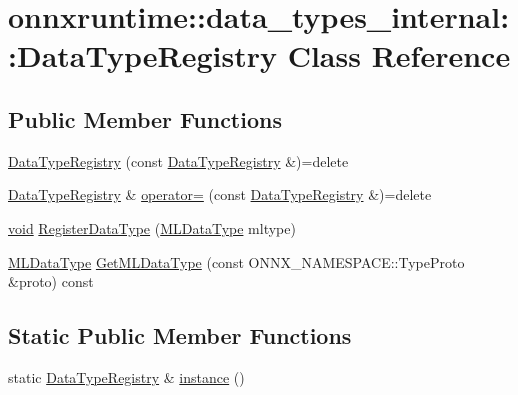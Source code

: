 \hypertarget{classonnxruntime_1_1data__types__internal_1_1DataTypeRegistry}{}\section{onnxruntime\+:\+:data\+\_\+types\+\_\+internal\+:\+:Data\+Type\+Registry Class Reference}
\label{classonnxruntime_1_1data__types__internal_1_1DataTypeRegistry}
\subsection*{Public Member Functions}
\begin{DoxyCompactItemize}
\item 
\mbox{\hyperlink{classonnxruntime_1_1data__types__internal_1_1DataTypeRegistry_a419c4ff0fd3f15aa7598a2a21339631a}{Data\+Type\+Registry}} (const \mbox{\hyperlink{classonnxruntime_1_1data__types__internal_1_1DataTypeRegistry}{Data\+Type\+Registry}} \&)=delete
\item 
\mbox{\hyperlink{classonnxruntime_1_1data__types__internal_1_1DataTypeRegistry}{Data\+Type\+Registry}} \& \mbox{\hyperlink{classonnxruntime_1_1data__types__internal_1_1DataTypeRegistry_a1f848e6242c4699d17431574ec30546e}{operator=}} (const \mbox{\hyperlink{classonnxruntime_1_1data__types__internal_1_1DataTypeRegistry}{Data\+Type\+Registry}} \&)=delete
\item 
\mbox{\hyperlink{mlasi_8h_a88f941d423cb2a819b70a1358982b1a6}{void}} \mbox{\hyperlink{classonnxruntime_1_1data__types__internal_1_1DataTypeRegistry_a3cdf7a35b2862255cc371f53ff59e3c1}{Register\+Data\+Type}} (\mbox{\hyperlink{namespaceonnxruntime_ad77d0a6e838ec7da5dc35fed5ee66b49}{M\+L\+Data\+Type}} mltype)
\item 
\mbox{\hyperlink{namespaceonnxruntime_ad77d0a6e838ec7da5dc35fed5ee66b49}{M\+L\+Data\+Type}} \mbox{\hyperlink{classonnxruntime_1_1data__types__internal_1_1DataTypeRegistry_a78a57f38bad060ebd7f1ba8f249a93d6}{Get\+M\+L\+Data\+Type}} (const O\+N\+N\+X\+\_\+\+N\+A\+M\+E\+S\+P\+A\+C\+E\+::\+Type\+Proto \&proto) const
\end{DoxyCompactItemize}
\subsection*{Static Public Member Functions}
\begin{DoxyCompactItemize}
\item 
static \mbox{\hyperlink{classonnxruntime_1_1data__types__internal_1_1DataTypeRegistry}{Data\+Type\+Registry}} \& \mbox{\hyperlink{classonnxruntime_1_1data__types__internal_1_1DataTypeRegistry_af5c4880169b0c2eebb106a063a55e586}{instance}} ()
\end{DoxyCompactItemize}


